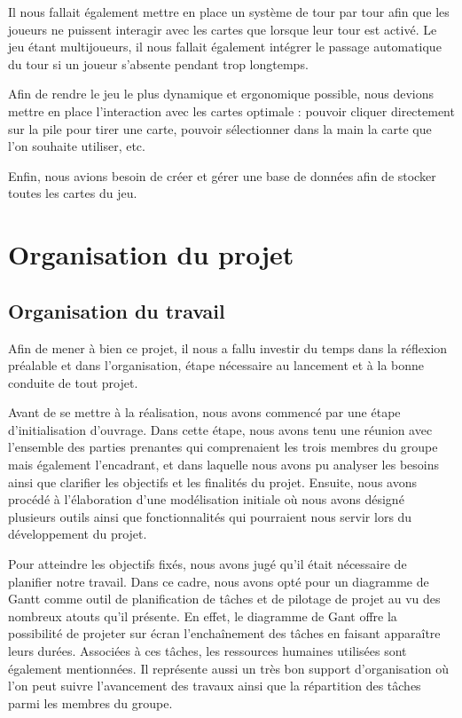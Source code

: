 \documentclass[12pt]{report}
\begin{document}
  	Il nous fallait également mettre en place un système de tour par tour afin que les joueurs ne puissent interagir avec les cartes que lorsque leur tour est activé. Le jeu étant multijoueurs, il nous fallait également intégrer le passage automatique du tour si un joueur s'absente pendant trop longtemps.

    Afin de rendre le jeu le plus dynamique et ergonomique possible, nous devions mettre en place l'interaction avec les cartes optimale : pouvoir cliquer directement sur la pile pour tirer une carte, pouvoir sélectionner dans la main la carte que l'on souhaite utiliser, etc.

    Enfin, nous avions besoin de créer et gérer une base de données afin de stocker toutes les cartes du jeu.

	\chapter{Organisation du projet}

    \section{Organisation du travail}
		Afin de mener à bien ce projet, il nous a fallu investir du temps dans la réflexion préalable et dans l’organisation, étape nécessaire au lancement et à la bonne conduite de tout projet.

		Avant de se mettre à la réalisation, nous avons commencé par une étape d’initialisation d’ouvrage. Dans cette étape, nous avons tenu une réunion avec l’ensemble des parties prenantes qui comprenaient les trois membres du groupe mais également l’encadrant, et dans laquelle nous avons pu analyser les besoins ainsi que clarifier les objectifs et les finalités du projet.
		Ensuite, nous avons procédé à l’élaboration d'une modélisation initiale où nous avons désigné plusieurs outils ainsi que fonctionnalités qui pourraient nous servir lors du développement du projet.

		Pour atteindre les objectifs fixés, nous avons jugé qu'il était nécessaire de planifier notre travail. Dans ce cadre, nous avons opté pour un diagramme de Gantt comme outil de planification de tâches et de pilotage de projet au vu des nombreux atouts qu’il présente. En effet, le diagramme de Gant offre la possibilité de projeter sur écran l’enchaînement des tâches en faisant apparaître leurs durées. Associées à ces tâches, les ressources humaines utilisées sont également mentionnées. Il représente aussi un très bon support d’organisation où l'on peut suivre l’avancement des travaux ainsi que la répartition des tâches parmi les membres du groupe.
\end{document}

